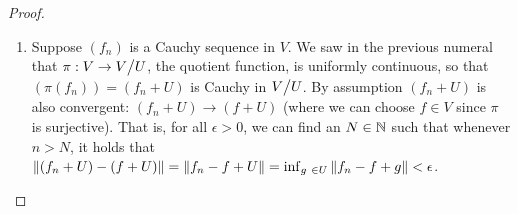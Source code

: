 \begin{proof}
\begin{enumerate}
    Now let $\pi: V \to \quot{V}{U}$ be the quotient map which is continuous (because $\norm{\pi(f)} = \inf_{g \in U} \norm{f + g} \leq \norm{f}$, so that it is bounded and hence uniformly continuous), we then have that 
    \begin{align*}
        \sum (f_n + U) 
        = \sum \pi(F_n) 
        = \pi(\sum F_n) 
        = \pi(F) 
        = F + U,
    \end{align*}
    where we exchanged summation and $\pi$ because of the continuity of $\pi$.
    Thus, $\sum (f_n + U)$ converges to $F + U$ and by 6.41 $\quot{V}{U}$ is Banach.


    (Alternative proof)
    Let $(f_n + U)$ be Cauchy.
    Thus, we can find a subsequence, $(f_{n_k} + U)$ with $\norm{(f_{n_{k+1}} + U) - (f_{n_k} + U)} < 1/2^k$ for all $k \geq 1$, for all $k \geq 1$.
    By the definition of the infimum, we can find $g_k \in U$ with $\norm{f_{n_{k+1}} - f_{n_k} + g_k} < 1/2^k$.

    Let $x_1 = f_{n_1}$ and more generally $x_{k+1} = f_{n_{k+1}} + \sum_{i=1}^k g_i$.
    We have that $x_k + U = f_{n_k} + U$ because $U$ is closed under addition, meaning that $\sum_{i=1}^k g_i \in U$.
    Thus, $x_k + U$ is a valid representative of $f_{n_k} + U$.

    We have $\norm{x_{k+1} - x_k} = \norm{f_{n_{k+1}} - f_{n_k} + g_k} < 1/2^k$, meaning that $(x_k)$ is Cauchy.
    Thus $x_k \to x$ because $V$ is Banach.

    Now we know that the quotient map $\pi: V \to \quot{V}{U}$ is continuous (since $\norm{\pi(f)} = \inf_{g \in U} \norm{f + g} \leq \norm{f}$), then $(f_{n_k} + U) = (x_k + U) \to (x + U)$.
    That is, $(f_n + U)$ is a Cauchy sequence with a convergent subsequence, which means that $(f_n + U)$ is itself convergent, with limit $x + U$.
    
    \item Suppose $(f_n)$ is a Cauchy sequence in $V$.
    We saw in the previous numeral that $\pi: V \to \quot{V}{U}$, the quotient function, is uniformly continuous, so that $(\pi(f_n)) = (f_n + U)$ is Cauchy in $\quot{V}{U}$.
    By assumption $(f_n + U)$ is also convergent: $(f_n + U) \to (f + U)$ (where we can choose $f \in V$ since $\pi$ is surjective).
    That is, for all $\epsilon > 0$, we can find an $N \in \mathbb{N}$ such that whenever $n > N$, it holds that $\left\lVert (f_n + U) - (f + U)\right\rVert = \left\lVert f_n - f + U\right\rVert = \inf_{g \ \in U}\left\lVert f_n - f + g\right\rVert < \epsilon$.


\end{enumerate}
\end{proof}
